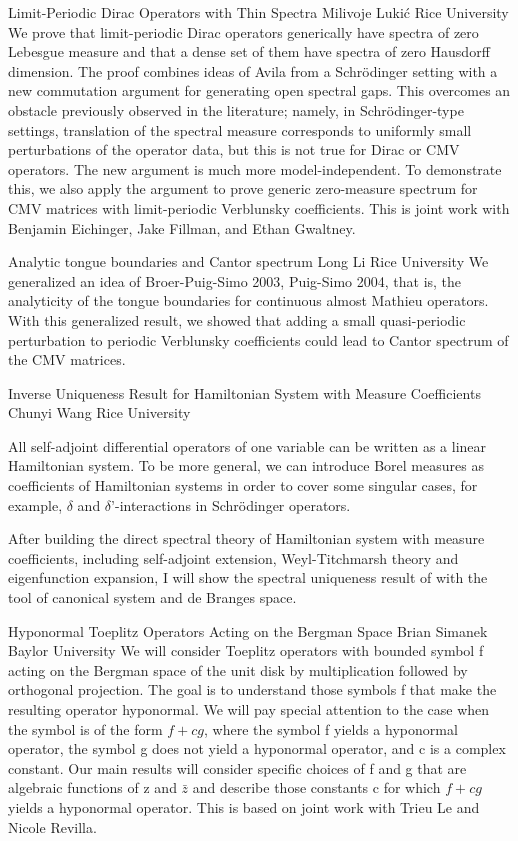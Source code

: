 \vspace{1.5ex}
\abs
{Limit-Periodic Dirac Operators with Thin Spectra}
{Milivoje Lukić}
{Rice University}
{We prove that limit-periodic Dirac operators generically have spectra
of zero Lebesgue measure and that a dense set of them have spectra of
zero Hausdorff dimension. The proof combines ideas of Avila from a
Schr\"odinger setting with a new commutation argument for generating
open spectral gaps. This overcomes an obstacle previously observed in
the literature; namely, in Schr\"odinger-type settings, translation of
the spectral measure corresponds to uniformly small perturbations of
the operator data, but this is not true for Dirac or CMV operators.
The new argument is much more model-independent. To demonstrate this,
we also apply the argument to prove generic zero-measure spectrum for
CMV matrices with limit-periodic Verblunsky coefficients. This is
joint work with Benjamin Eichinger, Jake Fillman, and Ethan Gwaltney.}


\vspace{1.5ex}
\abs
{Analytic tongue boundaries and Cantor spectrum}
{Long Li}
{Rice University}
{We generalized an idea of Broer-Puig-Simo 2003, Puig-Simo 2004, that is, the analyticity of the tongue boundaries for continuous almost Mathieu operators. With this generalized result, we showed that adding a small quasi-periodic perturbation to periodic Verblunsky coefficients could lead to Cantor spectrum of the CMV matrices.}


\vspace{1.5ex}
\abs
{Inverse Uniqueness Result for Hamiltonian System with Measure Coefficients}
{Chunyi Wang}
{Rice University}
{All self-adjoint differential operators of one variable can be written as a linear Hamiltonian system. To be more general, we can introduce Borel measures as coefficients of Hamiltonian systems in order to cover some singular cases, for example, $\delta$ and $\delta’$-interactions in Schr\"odinger operators.

After building the direct spectral theory of Hamiltonian system with measure coefficients, including self-adjoint extension, Weyl-Titchmarsh theory and eigenfunction expansion, I will show the spectral uniqueness result of with the tool of canonical system and de Branges space.}


\vspace{1.5ex}
\abs
{Hyponormal Toeplitz Operators Acting on the Bergman Space}
{Brian Simanek}
{Baylor University}
{We will consider Toeplitz operators with bounded symbol f acting on the Bergman space of the unit disk by multiplication followed by orthogonal projection.  The goal is to understand those symbols f that make the resulting operator hyponormal.  We will pay special attention to the case when the symbol is of the form $f+cg$, where the symbol f yields a hyponormal operator, the symbol g does not yield a hyponormal operator, and c is a complex constant.  Our main results will consider specific choices of f and g that are algebraic functions of z and $\bar{z}$ and describe those constants c for which $f+cg$ yields a hyponormal operator.  This is based on joint work with Trieu Le and Nicole Revilla.}


